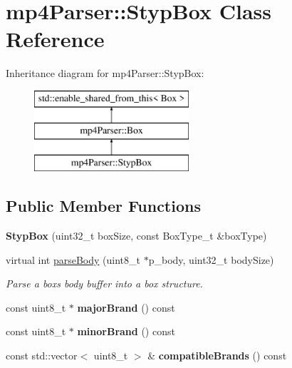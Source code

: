 \hypertarget{classmp4_parser_1_1_styp_box}{}\section{mp4\+Parser\+::Styp\+Box Class Reference}
\label{classmp4_parser_1_1_styp_box}
Inheritance diagram for mp4\+Parser\+::Styp\+Box\+:\begin{figure}[H]
\begin{center}
\leavevmode
\includegraphics[height=3.000000cm]{classmp4_parser_1_1_styp_box}
\end{center}
\end{figure}
\subsection*{Public Member Functions}
\begin{DoxyCompactItemize}
\item 
\mbox{\label{classmp4_parser_1_1_styp_box_aa98fbb7047fa61ad345eab92356bf387}} 
{\bfseries Styp\+Box} (uint32\+\_\+t box\+Size, const Box\+Type\+\_\+t \&box\+Type)
\item 
virtual int \mbox{\hyperlink{classmp4_parser_1_1_styp_box_a69fb40227f9718a745b8ac3c73b38e35}{parse\+Body}} (uint8\+\_\+t $\ast$p\+\_\+body, uint32\+\_\+t body\+Size)
\begin{DoxyCompactList}\small\item\em Parse a box\textquotesingle{}s body buffer into a box structure. \end{DoxyCompactList}\item 
\mbox{\label{classmp4_parser_1_1_styp_box_a06fbd705a6ec74900814a1f9f218ebee}} 
const uint8\+\_\+t $\ast$ {\bfseries major\+Brand} () const
\item 
\mbox{\label{classmp4_parser_1_1_styp_box_af389043cdda84d693ae177bb4c803450}} 
const uint8\+\_\+t $\ast$ {\bfseries minor\+Brand} () const
\item 
\mbox{\label{classmp4_parser_1_1_styp_box_a37a801491c6b1f02ebe7d7ce4fda920d}} 
const std\+::vector$<$ uint8\+\_\+t $>$ \& {\bfseries compatible\+Brands} () const
\end{DoxyCompactItemize}
